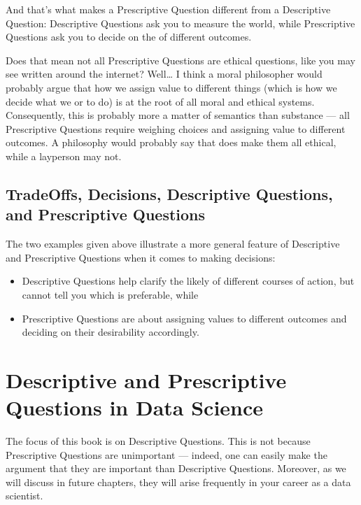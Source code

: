 \documentclass[letterpaper,10pt,english]{jupyterBook}
\begin{document}
\sphinxAtStartPar
And that’s what makes a Prescriptive Question different from a Descriptive Question: Descriptive Questions ask you to measure the world, while Prescriptive Questions ask you to decide on the  of different outcomes.

\sphinxAtStartPar
Does that mean not all Prescriptive Questions are ethical questions, like you may see written around the internet? Well… I think a moral philosopher would probably argue that how we assign value to different things (which is how we decide what we  or  to do) is at the root of all moral and ethical systems. Consequently, this is probably more a matter of semantics than substance — all Prescriptive Questions require weighing choices and assigning value to different outcomes. A philosophy would probably say that does make them all ethical, while a layperson may not.


\subsection{Trade\sphinxhyphen{}Offs, Decisions, Descriptive Questions, and Prescriptive Questions}
\label{\detokenize{30_questions/05_descriptive_v_prescriptive:trade-offs-decisions-descriptive-questions-and-prescriptive-questions}}
\sphinxAtStartPar
The two examples given above illustrate a more general feature of Descriptive and Prescriptive Questions when it comes to making decisions:
\begin{itemize}
\item {} 
\sphinxAtStartPar
Descriptive Questions help clarify the likely  of different courses of action, but cannot tell you which is preferable, while

\item {} 
\sphinxAtStartPar
Prescriptive Questions are about assigning values to different outcomes and deciding on their desirability accordingly.

\end{itemize}


\section{Descriptive and Prescriptive Questions in Data Science}
\label{\detokenize{30_questions/05_descriptive_v_prescriptive:descriptive-and-prescriptive-questions-in-data-science}}
\sphinxAtStartPar
The focus of this book is on Descriptive Questions. This is not because Prescriptive Questions are unimportant — indeed, one can easily make the argument that they are  important than Descriptive Questions. Moreover, as we will discuss in future chapters, they will arise frequently in your career as a data scientist.
\end{document}

